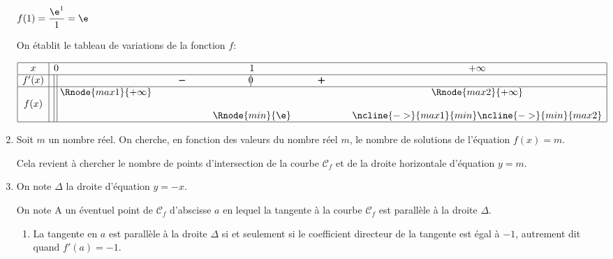 \begin{enumerate}
$f(1)=\dfrac{\e^{1}}{1}=\e$

On établit le tableau de variations de la fonction $f$:

\begin{center}
{\renewcommand{\arraystretch}{1.3}
\def\esp{\hspace*{1.5cm}}%
\def\hauteur{0pt}%
$\begin{array}{|c| l *3{c} c|}
\hline
 x & 0 & \esp & 1 & \esp & +\infty \\
\hline
f'(x) &  \vline\;\vline\;  &  \pmb{-} & \vline\hspace{-2.7pt}0 & \pmb{+} & \\  
\hline
  & \vline\;\vline\;  \Rnode{max1}{+\infty}  &  &  &  & \Rnode{max2}{+\infty}   \\
f(x) & \vline\;\vline\;  &  & & &  \rule{0pt}{\hauteur} \\
 &  \vline\;\vline\;  & &   \Rnode{min}{\e} & & \rule{0pt}{\hauteur}
\ncline{->}{max1}{min} \ncline{->}{min}{max2}\\
\hline
\end{array}$
}
\end{center}		
 
\item Soit $m$ un nombre réel. On cherche, en fonction des valeurs du nombre réel $m$, le nombre de solutions de l'équation $f(x) = m$.

Cela revient à chercher le nombre de points d'intersection de la courbe $\mathcal{C}_f$ et de la droite horizontale d'équation $y=m$.


\item  On note $\Delta$ la droite d'équation $y = -x$.

On note A un éventuel point de $\mathcal{C}_f$ d'abscisse $a$ en lequel la tangente à la courbe $\mathcal{C}_f$ est parallèle à la droite $\Delta$.
	\begin{enumerate}
		\item %
La tangente en $a$ est parallèle à la droite $\Delta$ si et seulement si le coefficient directeur de la tangente est égal à $-1$, autrement dit quand $f'(a)=-1$.


\end{enumerate}
\end{enumerate}

